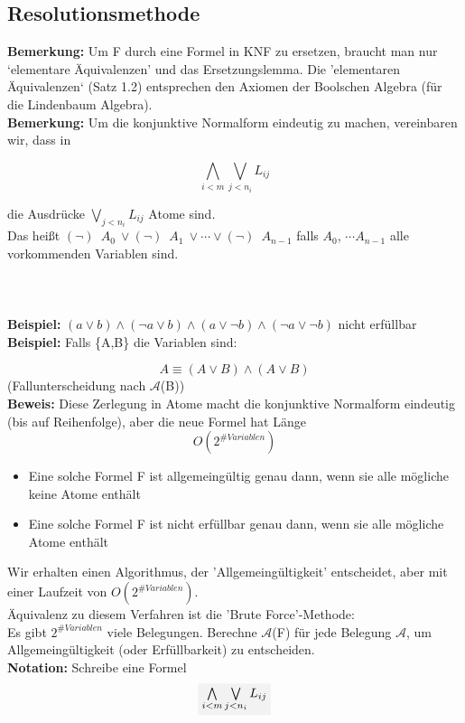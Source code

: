 \documentclass[a4paper]{scrartcl}
\begin{document}
\subsection{Resolutionsmethode}
\textbf{Bemerkung:} Um F durch eine Formel in KNF zu ersetzen, braucht man nur `elementare Äquivalenzen' und das Ersetzungslemma. Die 'elementaren Äquivalenzen‘ (Satz 1.2) entsprechen den  Axiomen der Boolschen Algebra (für die Lindenbaum Algebra). \\
\textbf{Bemerkung:} Um die konjunktive Normalform eindeutig zu machen, vereinbaren wir, dass in 

$$\bigwedge \limits_{i<m}\bigvee\limits_{j<n_{i}} L_{ij} $$

die Ausdrücke $\bigvee\limits_{j<n_{i}} L_{ij}$ Atome sind. \medskip\\
Das heißt $(\neg )$~$A_{0}~ \vee (\neg )$~$A_{1}~ \vee \cdots \vee (\neg )$~$A_{n-1}$  falls $A_{0}$, $\cdots A_{n-1}$ alle vorkommenden Variablen sind.\\\\\\\\

\textbf{Beispiel:}  $(a \vee b) \wedge (\neg a \vee b) \wedge (a \vee \neg b)  \wedge (\neg a \vee \neg b)$  nicht erfüllbar\medskip\\ 
\textbf{Beispiel:}  Falls \{A,B\} die Variablen sind:

$$ A \equiv (A \vee B) \wedge (A \vee B)$$
(Fallunterscheidung nach $\mathcal{A}$(B)) \medskip\\
\textbf{Beweis:} Diese Zerlegung in Atome macht die konjunktive Normalform eindeutig (bis auf Reihenfolge), aber die neue Formel hat Länge \\
$$O(2^{\# Variablen})$$
\begin{itemize}
\item Eine solche Formel F ist allgemeingültig genau dann, wenn sie alle mögliche keine Atome enthält 
\item Eine solche Formel F ist nicht erfüllbar genau dann, wenn sie alle mögliche Atome enthält  
\end{itemize}
Wir erhalten einen Algorithmus, der 'Allgemeingültigkeit' entscheidet, aber mit einer Laufzeit von $O(2^{\# Variablen})$.\\
Äquivalenz zu diesem Verfahren ist die 'Brute Force'-Methode:\\
Es gibt $2^{\# Variablen}$ viele Belegungen.
Berechne $\mathcal{A}$(F) für jede Belegung $\mathcal{A}$, um Allgemeingültigkeit (oder Erfüllbarkeit) zu entscheiden.\medskip\\
\textbf{Notation:} Schreibe eine Formel \\
$$\colorbox{light-gray}{$\bigwedge \limits_{i<m}\bigvee\limits_{j<n_{i}} L_{ij} $} $$
\end{document}
